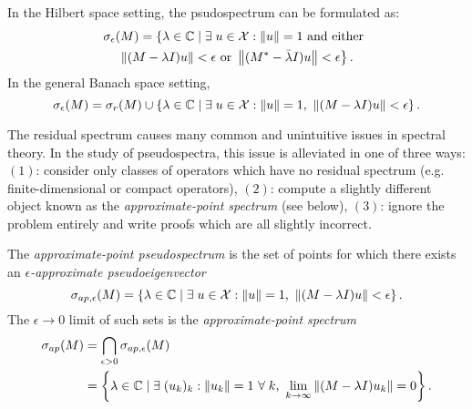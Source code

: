 \begin{corollary}
    \label{cor:pseudospectrum_min_residual}
    In the Hilbert space setting, the psudospectrum can be formulated as: 
    \begin{multline}
        \label{eq:pseudospectrum}
        \sigma_\epsilon (M) = \left\{ \lambda \in \mathbb{C} \mid \exists\; u \in \mathcal{X} : 
        \| u \| = 1 \text{ and either }\right. \\
        \left.\left\| (M - \lambda I) u \right\| < \epsilon \text{ or } 
        \left\| (M^* - \bar{\lambda} I) u \right\| < \epsilon \right\} .  
    \end{multline}
    In the general Banach space setting,
    \begin{equation}
        \label{eq:pseudospec_min}
        \sigma_\epsilon (M) = \sigma_r (M) \cup \left\{ \lambda \in \mathbb{C} \mid \exists\; u \in \mathcal{X} : 
        \| u \| = 1,\ \left\| (M - \lambda I) u \right\| < \epsilon \right\} . 
    \end{equation}
\end{corollary}

\iffalse
One sees from the proofs of lemma \ref{lem:injection_modulus} and theorem 
\ref{thm:resolvent_adjoint} that $\sigma (M)$ in equation \ref{eq:pseudospec_min} can be 
replaced with $\sigma_r (M)$. 
\fi
The residual spectrum causes many common and unintuitive 
issues in spectral theory. In the study of pseudospectra, this issue is alleviated in 
one of three ways: $(1)$: consider only classes of operators which have no residual 
spectrum (e.g. finite-dimensional or compact operators), $(2)$: compute a slightly 
different object known as the \emph{approximate-point spectrum} (see below), $(3)$: 
ignore the problem entirely and write proofs which are all slightly incorrect. 

\begin{definition}
    \label{def:approximate_point_spec}
    The \emph{approximate-point pseudospectrum} is the set of points for which there 
    exists an \emph{$\epsilon$-approximate pseudoeigenvector}
    \begin{equation}
        \sigma_{ap, \epsilon} (M) = \left\{ \lambda \in \bbC \mid 
            \exists\; u \in \scrX : \left\| u \right\| = 1,\ 
            \left\| (M - \lambda I) u \right\| < \epsilon 
        \right\} . 
    \end{equation}
    The $\epsilon \to 0$ limit of such sets is the \emph{approximate-point spectrum}
    \begin{align}
        \sigma_{ap} (M) &= \bigcap_{\epsilon > 0} \sigma_{ap, \epsilon} (M) \\
        &= \left\{ \lambda \in \bbC \mid
            \exists\; (u_k)_k : \left\| u_k \right\| = 1\ \forall\; k,\ 
            \lim_{k \to \infty} \left\| (M - \lambda I) u_k \right\| = 0
        \right\} . 
    \end{align}
\end{definition}


